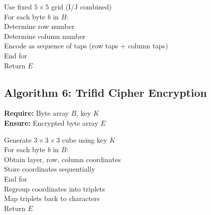 Use fixed $5 \times 5$ grid (I/J combined) \\
For each byte $b$ in $B$: \\
\quad Determine row number \\
\quad Determine column number \\
\quad Encode as sequence of taps (row taps + column taps) \\
End for \\
Return $E$

\subsection*{Algorithm 6: Trifid Cipher Encryption}
\textbf{Require:} Byte array $B$, key $K$ \\
\textbf{Ensure:} Encrypted byte array $E$

Generate $3 \times 3 \times 3$ cube using key $K$ \\
For each byte $b$ in $B$: \\
\quad Obtain layer, row, column coordinates \\
\quad Store coordinates sequentially \\
End for \\
Regroup coordinates into triplets \\
Map triplets back to characters \\
Return $E$
